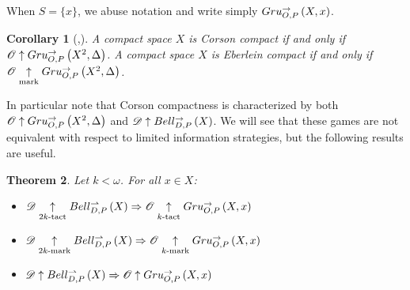 \documentclass{amsart}
\newtheorem{theorem}{Theorem}[section]
\newtheorem{corollary}[theorem]{Corollary}
\theoremstyle{definition}
\begin{document}
  When \(S=\{x\}\), we abuse notation and write simply
  \(Gru_{O,P}^{\to}\left({X},{x}\right)\).

  \begin{corollary}[\cite{MR752278},\cite{MR858337}]
    A compact space \(X\) is Corson compact if and only if
    \(\mathscr{O}\uparrow Gru_{O,P}^{\to}\left({X^2},{\Delta}\right)\).
    A compact space \(X\) is Eberlein compact if and only if
    \(\mathscr{O}\underset{\text{mark}}{\uparrow}Gru_{O,P}^{\to}\left({X^2},{\Delta}\right)\).
  \end{corollary}

  In particular note that Corson compactness is characterized by both
  \(\mathscr{O}\uparrow Gru_{O,P}^{\to}\left({X^2},{\Delta}\right)\) and
  \(\mathscr{D}\uparrow Bell_{D,P}^{\to}\left({X}\right)\). We will see that these games are not
  equivalent with respect to limited information strategies, but the following
  results are useful.

  \begin{theorem}
    Let \(k<\omega\). For all \(x\in X\):
    \begin{itemize}
      \item
        \(
          \mathscr{D}\underset{2k\text{-tact}}{\uparrow} Bell_{D,P}^{\rightharpoonup}\left({X}\right)
            \Rightarrow
          \mathscr{O} \underset{k\text{-tact}}{\uparrow} Gru_{O,P}^{\to}\left({X},{x}\right)
        \)
      \item
        \(
          \mathscr{D}\underset{2k\text{-mark}}{\uparrow} Bell_{D,P}^{\rightharpoonup}\left({X}\right)
            \Rightarrow
          \mathscr{O} \underset{k\text{-mark}}{\uparrow} Gru_{O,P}^{\to}\left({X},{x}\right)
        \)
      \item
        \(
          \mathscr{D}\uparrow Bell_{D,P}^{\rightharpoonup}\left({X}\right)
            \Rightarrow
          \mathscr{O} \uparrow Gru_{O,P}^{\to}\left({X},{x}\right)
        \)
    \end{itemize}
  \end{theorem}
\end{document}
